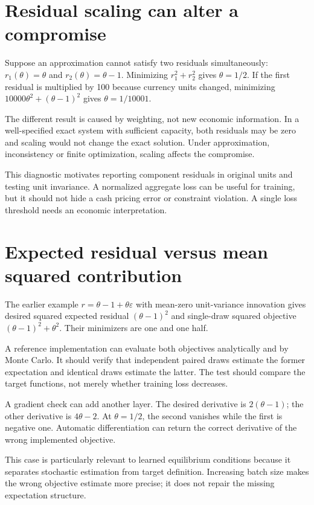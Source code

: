 \section{Residual scaling can alter a compromise}
Suppose an approximation cannot satisfy two residuals simultaneously: $r_1(\theta)=\theta$ and $r_2(\theta)=\theta-1$. Minimizing $r_1^2+r_2^2$ gives $\theta=1/2$. If the first residual is multiplied by 100 because currency units changed, minimizing $10000\theta^2+(\theta-1)^2$ gives $\theta=1/10001$.

The different result is caused by weighting, not new economic information. In a well-specified exact system with sufficient capacity, both residuals may be zero and scaling would not change the exact solution. Under approximation, inconsistency or finite optimization, scaling affects the compromise.

This diagnostic motivates reporting component residuals in original units and testing unit invariance. A normalized aggregate loss can be useful for training, but it should not hide a cash pricing error or constraint violation. A single loss threshold needs an economic interpretation.

\section{Expected residual versus mean squared contribution}
The earlier example $r=\theta-1+\theta\varepsilon$ with mean-zero unit-variance innovation gives desired squared expected residual $(\theta-1)^2$ and single-draw squared objective $(\theta-1)^2+\theta^2$. Their minimizers are one and one half.

A reference implementation can evaluate both objectives analytically and by Monte Carlo. It should verify that independent paired draws estimate the former expectation and identical draws estimate the latter. The test should compare the target functions, not merely whether training loss decreases.

A gradient check can add another layer. The desired derivative is $2(\theta-1)$; the other derivative is $4\theta-2$. At $\theta=1/2$, the second vanishes while the first is negative one. Automatic differentiation can return the correct derivative of the wrong implemented objective.

This case is particularly relevant to learned equilibrium conditions because it separates stochastic estimation from target definition. Increasing batch size makes the wrong objective estimate more precise; it does not repair the missing expectation structure.

